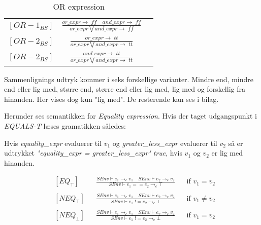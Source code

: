     \bgroup
    \def\arraystretch{3}
    \begin{table}[H]
    \centering
    \begin{tabular}{l c l}
        
        $[OR-1_{BS}]$ &$\frac{or\_expr \rightarrow \; ff \quad and\_expr \rightarrow \; ff}{or\_expr \bigvee and\_expr \rightarrow \; ff}$ & \\
    
        $[OR-2_{BS}]$ &$\frac{or\_expr \rightarrow \; tt}{or\_expr \bigvee and\_expr \rightarrow \; tt}$ &\\
        
        $[OR-2_{BS}]$ &$\frac{and\_expr \rightarrow \; tt}{or\_expr \bigvee and\_expr \rightarrow \; tt}$ &\\
        
    \end{tabular}
    \caption{OR expression}
    \label{tab:orExpr}
    \end{table}
    \egroup
Sammenlignings udtryk kommer i seks forskellige varianter. Mindre end, mindre end eller lig med, større end, større end eller lig med, lig med og forskellig fra hinanden. Her vises dog kun "lig med". De resterende kan ses i bilag.
    

\noindent Herunder ses semantikken for \textit{Equality expression}. Hvis der taget udgangspunkt i \textit{EQUALS-T} læses gramatikken således: 

\noindent Hvis \textit{equality\_expr} evaluerer til $v_1$ og \textit{greater\_less\_expr} evaluerer til $v_2$ så er udtrykket \textit{"equality\_expr = greater\_less\_expr"} \textit{true}, hvis $v_1$ og $v_2$ er lig med hinanden.

\begin{align*}
&[EQ_\top] & &\frac{SEnv \vdash e_1 \rightarrow_e v_1 \quad SEnv \vdash e_2 \rightarrow_e v_2}{SEnv \vdash e_1 == e_2 \rightarrow_e \top} & &\text{if } v_1 = v_2\\\\
&[NEQ_\top] & &\frac{SEnv \vdash e_1 \rightarrow_e v_1 \quad SEnv \vdash e_2 \rightarrow_e v_2}{SEnv \vdash e_1\; != e_2 \rightarrow_e \top} & &\text{if } v_1 \ne v_2\\\\
&[NEQ_\bot] & &\frac{SEnv \vdash e_1 \rightarrow_e v_1 \quad SEnv \vdash e_2 \rightarrow_e v_2}{SEnv \vdash e_1\; != e_2 \rightarrow_e \bot} & &\text{if } v_1 = v_2\\\\
\end{align*}

